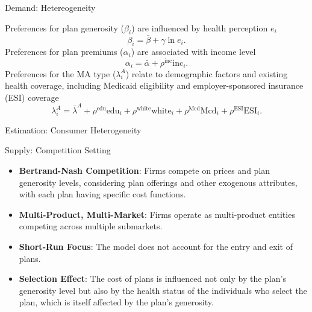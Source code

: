 \documentclass[professionalfonts, aspectratio=169]{beamer}
\begin{document}
\begin{frame}{Demand: Hetereogeneity}

  Preferences for plan generosity ($\beta_i$) are influenced by health perception $e_i$
  \begin{equation}
      \beta_i = \bar{\beta} + \gamma \ln e_i.
  \end{equation}
  Preferences for plan premiums ($\alpha_i$) are associated with income level
  \begin{equation}
      \alpha_i = \bar{\alpha} + \rho^{\text{inc}} \text{inc}_i.
  \end{equation}
  Preferences for the MA type ($\lambda^{A}_i$) relate to demographic factors and existing health coverage, including Medicaid eligibility and employer-sponsored insurance (ESI) coverage
  \begin{equation}
      \lambda^{A}_i = \bar{\lambda}^{A} + \rho^{\text{edu}} \text{edu}_i + \rho^{\text{white}} \text{white}_i + \rho^{\text{Mcd}} \text{Mcd}_i + \rho^{\text{ESI}} \text{ESI}_i.
  \end{equation}
  
\end{frame}

\begin{frame}{Estimation: Consumer Heterogeneity}
  
\end{frame}

\begin{frame}{Supply: Competition Setting}
  \begin{itemize}
    \item \textbf{Bertrand-Nash Competition}: Firms compete on prices and plan generosity levels, considering plan offerings and other exogenous attributes, with each plan having specific cost functions.
    \item \textbf{Multi-Product, Multi-Market}: Firms operate as multi-product entities competing across multiple submarkets.
    \item \textbf{Short-Run Focus}: The model does not account for the entry and exit of plans.
    \item \textbf{Selection Effect}: The cost of plans is influenced not only by the plan's generosity level but also by the health status of the individuals who select the plan, which is itself affected by the plan's generosity.
  \end{itemize}
\end{frame}
\end{document}
